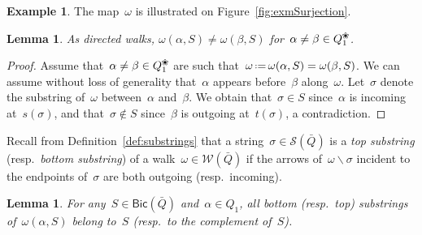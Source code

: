 \documentclass{amsart}
\newtheorem{lemma}[theorem]{Lemma}
\theoremstyle{definition}
\newtheorem{example}[theorem]{Example}
\newcommand{\ssm}{\smallsetminus} %
\newcommand{\eqdef}{\mbox{\,\raisebox{0.2ex}{\scriptsize\ensuremath{\mathrm:}}\ensuremath{=}\,}} %
\newcommand{\fref}[1]{Figure~\ref{#1}} %
\newcommand{\darkblue}{\color{darkblue}} %
\newcommand{\defn}[1]{\textsl{\darkblue #1}} %
\newcommand{\blossom}{^\text{\ding{96}}} %
\newcommand{\strings}{\mathcal{S}} %
\newcommand{\walks}{\mathcal{W}} %
\newcommand{\Bicl}[1]{\mathsf{Bic}(#1)} %
\begin{document}
\begin{example}
The map~$\omega$ is illustrated on \fref{fig:exmSurjection}.
\end{example}

\begin{lemma}
\label{lem:distinctDirectedWalks}
As directed walks, $\omega(\alpha,S) \ne \omega(\beta,S)$ for~$\alpha \ne \beta \in Q_1\blossom$.
\end{lemma}

\begin{proof}
Assume that~$\alpha \ne \beta \in Q_1\blossom$ are such that~$\omega \eqdef \omega(\alpha,S) = \omega(\beta,S)$.
We can assume without loss of generality that~$\alpha$ appears before~$\beta$ along~$\omega$.
Let~$\sigma$ denote the substring of~$\omega$ between~$\alpha$ and~$\beta$.
We obtain that~$\sigma \in S$ since~$\alpha$ is incoming at~$s(\sigma)$, and that~$\sigma \notin S$ since~$\beta$ is outgoing at~$t(\sigma)$, a contradiction.
\end{proof}

Recall from Definition~\ref{def:substrings} that a string~$\sigma \in \strings(\bar Q)$ is a \defn{top substring} (resp.~\defn{bottom substring}) of a walk~$\omega \in \walks(\bar Q)$ if the arrows of~$\omega \ssm \sigma$ incident to the endpoints of~$\sigma$ are both outgoing (resp.~incoming).

\begin{lemma}
\label{lem:positiveNegativeOrientation}
For any~$S \in \Bicl{\bar Q}$ and~$\alpha \in Q_1$, all bottom (resp.~top) substrings of~$\omega(\alpha,S)$ belong to~$S$ (resp.~to the complement of~$S$).
\end{lemma}
\end{document}
